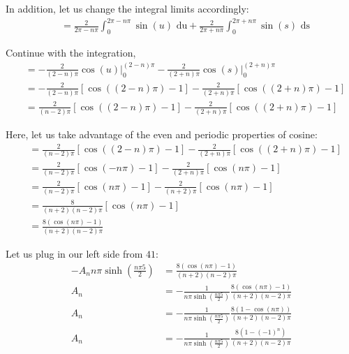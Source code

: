 \begin{enumerate}
In addition, let us change the integral limits accordingly:
%
\begin{align}
  & =
  \frac{2}{2 \pi - n \pi} \int^{2\pi - n\pi}_0 \sin(u) \text{ du} +
  \frac{2}{2 \pi + n \pi} \int^{2\pi + n\pi}_0 \sin(s) \text{ ds}
\end{align}

Continue with the integration,
%
\begin{align}
  & = - \frac{2}{(2 - n) \pi} \cos(u) \Big|^{(2 - n) \pi}_0
  - \frac{2}{(2 + n) \pi} \cos(s) \Big|^{(2 + n) \pi}_0\\
  & =
  - \frac{2}{(2 - n) \pi}
  \left[
    \cos((2 - n)\pi) - 1
  \right]
  - \frac{2}{(2 + n)\pi}
  \left[
    \cos((2 + n)\pi) - 1
  \right]\\
  & =
  \frac{2}{(n - 2) \pi}
  \left[
    \cos((2 - n)\pi) - 1
  \right]
  - \frac{2}{(2 + n)\pi}
  \left[
    \cos((2 + n)\pi) - 1
  \right]
\end{align}

Here, let us take advantage of the even and periodic properties of cosine:
%
\begin{align}
  & =
  \frac{2}{(n - 2) \pi}
  \left[
    \cos((2 - n)\pi) - 1
  \right]
  - \frac{2}{(2 + n)\pi}
  \left[
    \cos((2 + n)\pi) - 1
  \right]\\
  & =
  \frac{2}{(n - 2) \pi}
  \left[
    \cos(-n\pi) - 1
  \right]
  - \frac{2}{(2 + n)\pi}
  \left[
    \cos(n\pi) - 1
  \right]\\
  & =
  \frac{2}{(n - 2) \pi}
  \left[
    \cos(n\pi) - 1
  \right]
  - \frac{2}{(n + 2)\pi}
  \left[
    \cos(n\pi) - 1
  \right]\\
  & =
  \frac{8}{(n + 2)(n - 2) \pi}
  \left[
    \cos(n\pi) - 1
  \right]\\
  & =
  \frac{8 (\cos (n \pi) - 1)}{(n + 2)(n - 2) \pi}
\end{align}

Let us plug in our left side from $41$:
%
\begin{align}
  -A_n n \pi \sinh\left(\frac{n \pi 5}{2}\right) & =
  \frac{8 (\cos (n \pi) - 1)}{(n + 2)(n - 2) \pi}\\
  A_n & =
  - \frac{1}{n \pi \sinh \left(\frac{n \pi 5}{2}\right)}
  \frac{8 (\cos (n \pi) - 1)}{(n + 2)(n - 2) \pi}\\
  A_n & =
  - \frac{1}{n \pi \sinh \left(\frac{n \pi 5}{2}\right)}
  \frac{8 (1 - \cos (n \pi))}{(n + 2)(n - 2) \pi}\\
  A_n & =
  - \frac{1}{n \pi \sinh \left(\frac{n \pi 5}{2}\right)}
  \frac{8 (1 - (-1)^n)}{(n + 2)(n - 2) \pi}
\end{align}



\end{enumerate}
